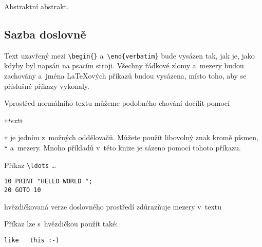 \newenvironment{abstract}%
        {\begin{center}\begin{small}\begin{minipage}{0.8\textwidth}}%
        {\end{minipage}\end{small}\end{center}}
\begin{example}
\begin{abstract}
Abstraktní abstrakt.
\end{abstract}
\end{example}

\subsection{Sazba doslovně}

Text uzavřený mezi \verb|\begin{|\verb|}|
a~\verb|\end{verbatim}| bude vysázen tak, jak je, jako kdyby byl napsán
na psacím stroji. Všechny řádkové zlomy a~mezery budou zachovány
a~jména \LaTeX ových příkazů budou vysázena, místo toho, aby se příslušné
příkazy vykonaly.

Vprostřed normálního textu můžeme podobného chování docílit pomocí
\begin{lscommand}
\verb|+|\emph{text}\verb|+|
\end{lscommand}
\noindent \verb|+| je jedním z~možných oddělovačů. Můžete použít
libovolný znak kromě písmen, \verb|*| a~mezery. Mnoho příkladů v~této
knize je sázeno pomocí tohoto příkazu.

\begin{example}
Příkaz \verb|\ldots| \ldots

\begin{verbatim}
10 PRINT "HELLO WORLD ";
20 GOTO 10
\end{verbatim}
\end{example}

\begin{example}
\begin{verbatim*}
hvězdičkovaná verze
doslovného     prostředí
zdůrazňuje    mezery
v~textu
\end{verbatim*}
\end{example}

Příkaz  lze s~hvězdičkou použít také:

\begin{example}
\verb*|like   this :-) |
\end{example}

